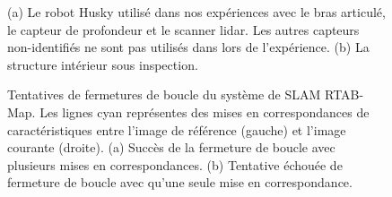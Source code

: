 \begin{figure}[htb]
\centerline{
}
	\centering
    \caption{
    (a) Le robot Husky utilisé dans nos expériences avec le bras articulé, le capteur de profondeur et le scanner lidar. Les autres capteurs non-identifiés ne sont pas utilisés dans lors de l'expérience.
    (b) La structure intérieur sous inspection.}
    \label{fig:husky_exp}
\end{figure}

\begin{figure}[ht]
  \centering
  \hfil
  \caption{
    Tentatives de fermetures de boucle du système de SLAM RTAB-Map. Les lignes cyan représentes des mises en correspondances de caractéristiques entre l'image de référence (gauche) et l'image courante (droite).
    (a) Succès de la fermeture de boucle avec plusieurs mises en correspondances. (b) Tentative échouée de fermeture de boucle avec qu'une seule mise en correspondance.
  }
  \label{fig:visual_loop_closure}
\end{figure}

